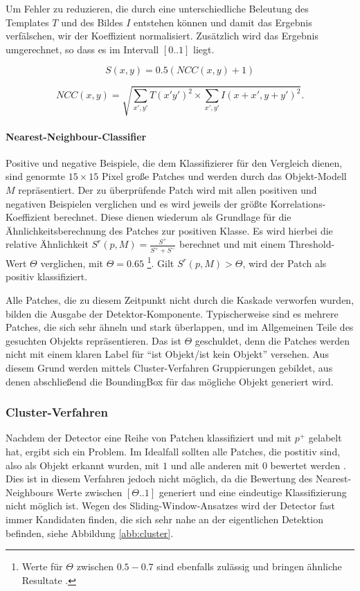 	Um Fehler zu reduzieren, die durch eine unterschiedliche Beleutung des Templates $T$ und des Bildes $I$ entstehen können und damit	das Ergebnis verfälschen, wir der Koeffizient normalisiert. Zusätzlich wird das Ergebnis umgerechnet, so dass es im Intervall $[0..1]$	liegt.

	\begin{equation}
	S(x,y)=0.5(NCC(x,y)+1)
	\end{equation}

	\begin{equation}
	NCC(x,y)=\sqrt{\underset{x',y'}{\sum}T(x'y')^{2}\times\underset{x',y'}{\sum}I(x+x',y+y')^{2}}.
	\end{equation}

	\paragraph{Nearest-Neighbour-Classifier}
	Positive und negative Beispiele, die dem Klassifizierer für den Vergleich dienen, sind genormte $15\times15$ Pixel große Patches und werden	durch das Objekt-Modell $M$ repräsentiert. Der zu überprüfende Patch wird mit allen positiven und negativen Beispielen verglichen und es wird jeweils der größte Korrelations-Koeffizient berechnet. Diese dienen wiederum als Grundlage für die Ähnlichkeitsberechnung des Patches zur positiven Klasse. Es wird hierbei die relative Ähnlichkeit $S^{r}(p,M)=\frac{S^{+}}{S^{+}+S^{-}}$	berechnet und mit einem Threshold-Wert $\Theta$ verglichen, mit $\Theta=0.65$	\footnote{Werte für $\Theta$ zwischen $0.5-0.7$ sind ebenfalls zulässig und	bringen ähnliche Resultate \cite{TLD}. }. Gilt $S^{r}(p,M)>\Theta$, wird der Patch als positiv klassifiziert.

	Alle Patches, die zu diesem Zeitpunkt nicht durch die Kaskade verworfen wurden, bilden die Ausgabe der Detektor-Komponente. Typischerweise sind es mehrere Patches, die sich sehr ähneln und stark überlappen, und im Allgemeinen Teile des gesuchten Objekts repräsentieren. Das ist $\Theta$ geschuldet, denn die Patches werden nicht mit einem klaren Label für ``ist Objekt/ist kein Objekt'' versehen. Aus diesem Grund werden mittels Cluster-Verfahren Gruppierungen gebildet, aus denen abschließend die BoundingBox für das mögliche Objekt generiert wird.


	\subsubsection{Cluster-Verfahren}
	Nachdem der Detector eine Reihe von Patchen klassifiziert und mit	$p^{+}$ gelabelt hat, ergibt sich ein Problem. Im Idealfall sollten	alle Patches, die postitiv sind, also als Objekt erkannt wurden, mit $1$ und alle anderen mit $0$ bewertet werden \cite{BAB}. Dies ist in diesem Verfahren jedoch nicht möglich, da die Bewertung des Nearest-Neighbours	Werte zwischen $[\Theta..1]$ generiert und eine eindeutige Klassifizierung nicht möglich ist. Wegen des Sliding-Window-Ansatzes wird der Detector	fast immer Kandidaten finden, die sich sehr nahe an der eigentlichen Detektion befinden, siehe Abbildung \ref{abb:cluster}.

